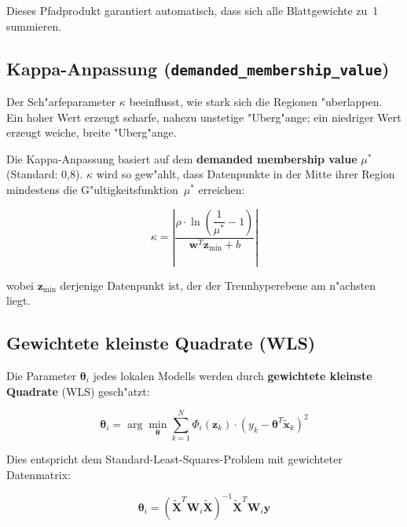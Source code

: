\documentclass[12pt,a4paper]{article}
\begin{document}
Dieses Pfadprodukt garantiert automatisch, dass sich alle Blattgewichte zu~1 summieren.

\subsection{Kappa-Anpassung (\texttt{demanded\_membership\_value})}

Der Sch"arfeparameter $\kappa$ beeinflusst, wie stark sich die Regionen "uberlappen. Ein hoher Wert erzeugt scharfe, nahezu unstetige "Uberg"ange; ein niedriger Wert erzeugt weiche, breite "Uberg"ange.

Die Kappa-Anpassung basiert auf dem \textbf{demanded membership value} $\mu^*$ (Standard: 0{,}8). $\kappa$ wird so gew"ahlt, dass Datenpunkte in der Mitte ihrer Region mindestens die G"ultigkeitsfunktion~$\mu^*$ erreichen:

\begin{equation}
  \kappa = \left|\frac{\rho \cdot \ln\left(\dfrac{1}{\mu^*} - 1\right)}{\mathbf{w}^T \mathbf{z}_{\min} + b}\right|
\end{equation}

wobei $\mathbf{z}_{\min}$ derjenige Datenpunkt ist, der der Trennhyperebene am n"achsten liegt.

\subsection{Gewichtete kleinste Quadrate (WLS)}

Die Parameter $\boldsymbol{\theta}_i$ jedes lokalen Modells werden durch \textbf{gewichtete kleinste Quadrate} (WLS) gesch"atzt:

\begin{equation}
  \boldsymbol{\theta}_i = \arg\min_{\boldsymbol{\theta}} \sum_{k=1}^{N} \Phi_i(\mathbf{z}_k) \cdot \left(y_k - \boldsymbol{\theta}^T \tilde{\mathbf{x}}_k\right)^2
\end{equation}

Dies entspricht dem Standard-Least-Squares-Problem mit gewichteter Datenmatrix:

\begin{equation}
  \boldsymbol{\theta}_i = \left(\tilde{\mathbf{X}}^T \mathbf{W}_i \tilde{\mathbf{X}}\right)^{-1} \tilde{\mathbf{X}}^T \mathbf{W}_i \mathbf{y}
\end{equation}
\end{document}
